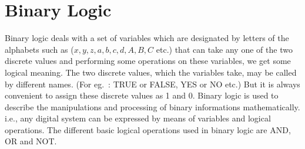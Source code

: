 \begin{solution}
\end{solution}

\section{Binary Logic}\label{sec5.11}

Binary logic deals with a set of variables which are designated by letters of the alphabets such as ($x, y, z, a, b, c, d, A, B, C$ etc.) that can take any one of the two discrete values and performing some operations on these variables, we get some logical meaning. The two discrete values, which the variables take, may be called by different names. (For eg.~: TRUE or FALSE, YES or NO etc.) But it is always convenient to assign these discrete values as 1 and 0. Binary logic is used to describe the manipulations and processing of binary informations mathematically. i.e., any digital system can be expressed by means of variables and logical operations. The different basic logical operations used in binary logic are AND, OR and NOT.

